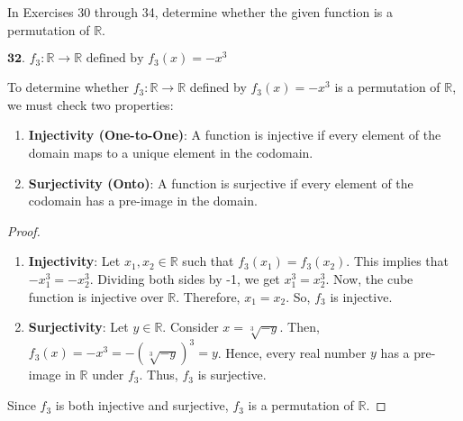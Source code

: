 \documentclass[12pt]{amsart}
\theoremstyle{definition}
\numberwithin{equation}{section}
\theoremstyle{plain}
\newcommand{\R}{\mathbb{R}}
\begin{document}
\begin{exercise}{32} In Exercises 30 through 34, determine whether the given function is a permutation of $\R$.

    \(\textbf{32. }f_3 : \R \rightarrow \R \text{ defined by } f_3(x) = -x^3\)


    To determine whether \( f_3 : \R \rightarrow \R \) defined by \( f_3(x) = -x^3 \) is a permutation of \( \R \), we must check two properties:

    \begin{enumerate}
        \item \textbf{Injectivity (One-to-One)}: A function is injective if every element of the domain maps to a unique element in the codomain. 
        
        \item \textbf{Surjectivity (Onto)}: A function is surjective if every element of the codomain has a pre-image in the domain.
    \end{enumerate}
        
    \begin{proof} $ $ \\
    
    \begin{enumerate}
        \item \textbf{Injectivity}: 
        Let \( x_1, x_2 \in \R \) such that \( f_3(x_1) = f_3(x_2) \). 
        This implies that \( -x_1^3 = -x_2^3 \). 
        Dividing both sides by -1, we get \( x_1^3 = x_2^3 \). 
        Now, the cube function is injective over \( \R \). Therefore, \( x_1 = x_2 \).
        So, \( f_3 \) is injective.
        
        \item \textbf{Surjectivity}: 
        Let \( y \in \R \). Consider \( x = \sqrt[3]{-y} \). Then, \( f_3(x) = -x^3 = -(\sqrt[3]{-y})^3 = y \).
        Hence, every real number \( y \) has a pre-image in \( \R \) under \( f_3 \). Thus, \( f_3 \) is surjective.
    \end{enumerate}
    
    Since \( f_3 \) is both injective and surjective, \( f_3 \) is a permutation of \( \R \).
    
    \end{proof}
\end{exercise}
\vspace*{20pt}
\end{document}
